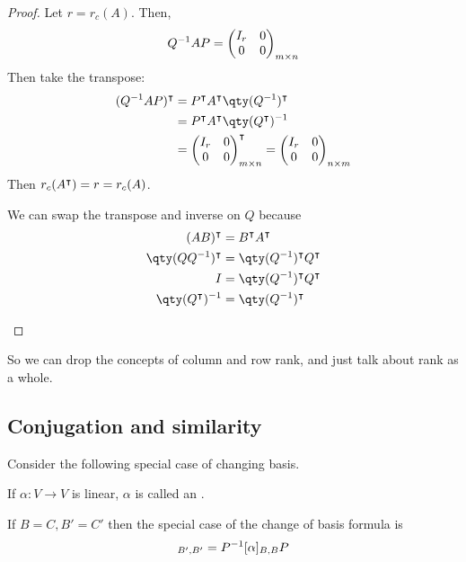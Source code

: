 \begin{proof}
    Let $r = r_c(A)$.
    Then,
    \begin{align*}
        Q^{-1} AP = \begin{pmatrix}
            I_r & 0 \\
            0   & 0
        \end{pmatrix}_{m \times n}
    \end{align*}
    Then take the transpose:
    \begin{align*}
        (Q\inv AP)^\transpose &= P^\transpose A^\transpose \qty(Q\inv)^\transpose \\
        &= P^\transpose A^\transpose \qty(Q^\transpose)\inv \\
        &= \begin{pmatrix}
            I_r & 0 \\
            0   & 0
        \end{pmatrix}_{m \times n}^\transpose = \begin{pmatrix}
            I_r & 0 \\
            0   & 0
        \end{pmatrix}_{n \times m}
    \end{align*}
    Then $r_c(A^\intercal) = r = r_c(A)$.

    \begin{note}
        We can swap the transpose and inverse on $Q$ because
        \begin{align*}
            (AB)^\transpose &= B^\transpose A^\transpose           \\
            \qty(QQ\inv)^\transpose &= \qty(Q\inv)^\transpose Q^\transpose \\
            I &= \qty(Q\inv)^\transpose Q^\transpose \\
            \qty(Q^\transpose)\inv &= \qty(Q\inv)^\transpose
        \end{align*}
    \end{note} 
\end{proof}
So we can drop the concepts of column and row rank, and just talk about rank as a whole.

\subsection{Conjugation and similarity}
Consider the following special case of changing basis.
\begin{definition}
    If $\alpha \colon V \to V$ is linear, $\alpha$ is called an .
\end{definition} 
If $B = C, B' = C'$ then the special case of the change of basis formula is
\begin{align*}
    [\alpha]_{B',B'} = P\inv [\alpha]_{B,B} P
\end{align*}

